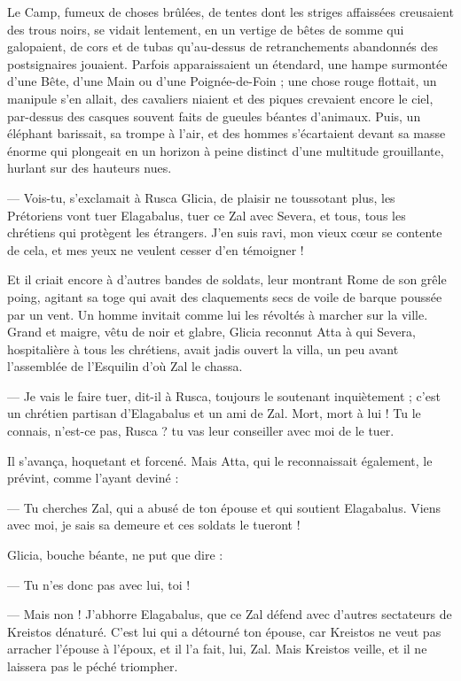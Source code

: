 \documentclass[a4paper, 11pt, oneside, polutonikogreek, french]{article}
\begin{document}
Le Camp, fumeux de choses brûlées, de tentes dont les striges affaissées creusaient des trous noirs, se vidait lentement, en un vertige de bêtes de somme qui galopaient, de cors et de tubas qu'au-dessus de retranchements abandonnés des postsignaires jouaient. Parfois apparaissaient un étendard, une hampe surmontée d'une Bête, d'une Main ou d'une Poignée-de-Foin ; une chose rouge flottait, un manipule s'en allait, des cavaliers niaient et des piques crevaient encore le ciel, par-dessus des casques souvent faits de gueules béantes d'animaux. Puis, un éléphant barissait, sa trompe à l'air, et des hommes s'écartaient devant sa masse énorme qui plongeait en un horizon à peine distinct d'une multitude grouillante, hurlant sur des hauteurs nues.

--- Vois-tu, s'exclamait à Rusca Glicia, de plaisir ne toussotant plus, les Prétoriens vont tuer Elagabalus, tuer ce Zal avec Severa, et tous, tous les chrétiens qui protègent les étrangers. J'en suis ravi, mon vieux cœur se contente de cela, et mes yeux ne veulent cesser d'en témoigner !

Et il criait encore à d'autres bandes de soldats, leur montrant Rome de son grêle poing, agitant sa toge qui avait des claquements secs de voile de barque poussée par un vent. Un homme invitait comme lui les révoltés à marcher sur la ville. Grand et maigre, vêtu de noir et glabre, Glicia reconnut Atta à qui Severa, hospitalière à tous les chrétiens, avait jadis ouvert la villa, un peu avant l'assemblée de l'Esquilin d'où Zal le chassa.

--- Je vais le faire tuer, dit-il à Rusca, toujours le soutenant inquiètement ; c'est un chrétien partisan d'Elagabalus et un ami de Zal. Mort, mort à lui ! Tu le connais, n'est-ce pas, Rusca ? tu vas leur conseiller avec moi de le tuer.

Il s'avança, hoquetant et forcené. Mais Atta, qui le reconnaissait également, le prévint, comme l'ayant deviné :

--- Tu cherches Zal, qui a abusé de ton épouse et qui soutient Elagabalus. Viens avec moi, je sais sa demeure et ces soldats le tueront !

Glicia, bouche béante, ne put que dire :

--- Tu n'es donc pas avec lui, toi !

--- Mais non ! J'abhorre Elagabalus, que ce Zal défend avec d'autres sectateurs de Kreistos dénaturé. C'est lui qui a détourné ton épouse, car Kreistos ne veut pas arracher l'épouse à l'époux, et il l'a fait, lui, Zal. Mais Kreistos veille, et il ne laissera pas le péché triompher.
\end{document}
